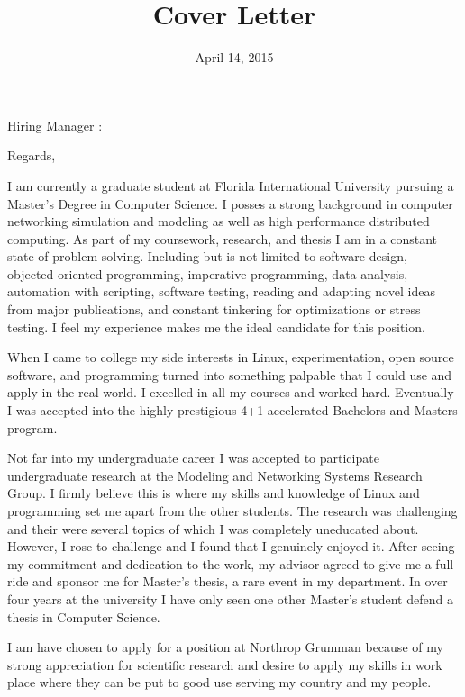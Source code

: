 \documentclass[10pt,a4paper,sans]{moderncv}        %
\title{Cover Letter}                               %
\begin{document}
\date{April 14, 2015}
\opening{Hiring Manager :}
\closing{Regards,}
\makelettertitle

I am currently a graduate student at Florida International University pursuing a Master's
Degree in Computer Science. I posses a strong background in computer networking simulation and
modeling as well as high performance distributed computing. As part of my coursework, research,
and thesis I am in a constant state of problem solving. Including but is not limited
to software design, objected-oriented programming, imperative programming, data analysis, automation with
scripting, software testing, reading and adapting novel ideas from major publications, and
constant tinkering for optimizations or stress testing. I feel my
experience makes me the ideal candidate for this position.

When I came to college my side interests in Linux, experimentation, open source software, and programming
turned into something palpable that I could use and apply in the real world. I excelled in all
my courses and worked hard. Eventually I was accepted into the highly prestigious 4+1 accelerated
Bachelors and Masters program. 

Not far into my undergraduate career I was accepted to participate undergraduate research at
the Modeling and Networking Systems Research Group. I firmly believe this is where my skills 
and knowledge of Linux and programming set me apart from the other students. The research was 
challenging and their were several topics of which I was completely uneducated about. However, 
I rose to challenge and I found that I genuinely enjoyed it. After seeing my commitment and 
dedication to the work, my advisor agreed to give me a full ride and sponsor me for Master's 
thesis, a rare event in my department. In over four years at the university I have only seen 
one other Master's student defend a thesis in Computer Science.

I am have chosen to apply for a position at Northrop Grumman because of my strong appreciation for scientific
research and desire to apply my skills in work place where they can be put to good use serving
my country and my people.
\end{document}
